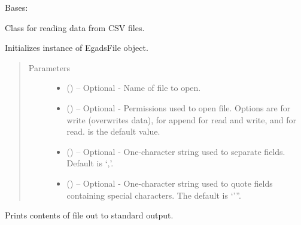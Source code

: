 \documentclass[a4paper,10pt,openany,english]{sphinxmanual}
\begin{document}

\begin{fulllineitems}
\label{egadsapi:egads.input.text_file_io.EgadsCsv}
Bases: {\hyperref[egadsapi:egads.input.text_file_io.EgadsFile]{}}

Class for reading data from CSV files.

Initializes instance of EgadsFile object.
\begin{quote}\begin{description}
\item[{Parameters}] \leavevmode\begin{itemize}
\item {} 
 () -- Optional - Name of file to open.

\item {} 
 () -- Optional - Permissions used to open file. Options are  for write (overwrites
data),  for append  for read and write, and  for read.  is 
the default value.

\item {} 
 () -- Optional - One-character string used to separate fields. Default is `,'.

\item {} 
 () -- Optional - One-character string used to quote fields containing special characters.
The default is `'''.

\end{itemize}

\end{description}\end{quote}

\begin{fulllineitems}
\label{egadsapi:egads.input.text_file_io.EgadsCsv.display_file}
Prints contents of file out to standard output.


\end{fulllineitems}
\end{fulllineitems}
\end{document}
